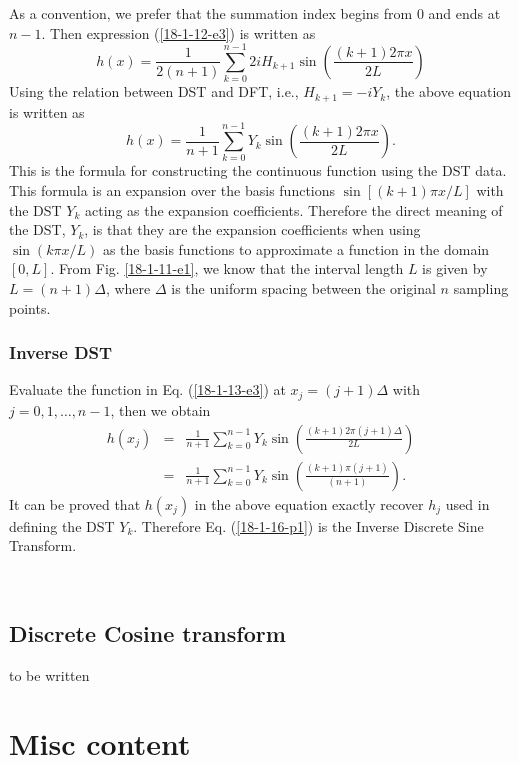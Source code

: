 \documentclass{article}
\begin{document}
As a convention, we prefer that the summation index begins from 0 and ends at
$n - 1$. Then expression (\ref{18-1-12-e3}) is written as
\[ h (x) = \frac{1}{2 (n + 1)} \sum_{k = 0}^{n - 1} 2 i H_{k + 1} \sin \left(
   \frac{(k + 1) 2 \pi x}{2 L} \right) \]
Using the relation between DST and DFT, i.e., $H_{k + 1} = - i Y_k$, the above
equation is written as
\begin{equation}
  \label{18-1-13-e3} h (x) = \frac{1}{n + 1} \sum_{k = 0}^{n - 1} Y_k \sin
  \left( \frac{(k + 1) 2 \pi x}{2 L} \right) .
\end{equation}
This is the formula for constructing the continuous function using the DST
data. This formula is an expansion over the basis functions $\sin [(k + 1) \pi
x / L]$ with the DST $Y_k$ acting as the expansion coefficients. Therefore the
direct meaning of the DST, $Y_k$, is that they are the expansion coefficients
when using $\sin (k \pi x / L)$ as the basis functions to approximate a
function in the domain $[0, L]$. From Fig. \ref{18-1-11-e1}, we know that the
interval length $L$ is given by $L = (n + 1) \Delta$, where $\Delta$ is the
uniform spacing between the original $n$ sampling points.

\subsubsection{Inverse DST}

Evaluate the function in Eq. (\ref{18-1-13-e3}) at $x_j = (j + 1) \Delta$ with
$j = 0, 1, \ldots, n - 1$, then we obtain
\begin{eqnarray}
  h (x_j) & = & \frac{1}{n + 1} \sum_{k = 0}^{n - 1} Y_k \sin \left( \frac{(k
  + 1) 2 \pi (j + 1) \Delta}{2 L} \right) \nonumber\\
  & = & \frac{1}{n + 1} \sum_{k = 0}^{n - 1} Y_k \sin \left( \frac{(k + 1)
  \pi (j + 1)}{(n + 1)} \right) .  \label{18-1-16-p1}
\end{eqnarray}
It can be proved that $h (x_j)$ in the above equation exactly recover $h_j$
used in defining the DST $Y_k$. Therefore Eq. (\ref{18-1-16-p1}) is the
Inverse Discrete Sine Transform.

\

\subsection{Discrete Cosine transform}

to be written

\section{Misc content}
\end{document}
